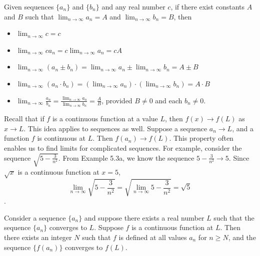 \documentclass{report}
\begin{document}
      \bigbreak \noindent 
      \begin{thrm}
          Given sequences \( \{a_n\} \) and \( \{b_n\} \) and any real number \( c \), if there exist constants \( A \) and \( B \) such that \( \lim_{{n \to \infty}} a_n = A \) and \( \lim_{{n \to \infty}} b_n = B \), then
          \begin{itemize}
            \item \( \lim_{{n \to \infty}} c = c \)
            \item \( \lim_{{n \to \infty}} c a_n = c \lim_{{n \to \infty}} a_n = cA \)
            \item \( \lim_{{n \to \infty}} (a_n \pm b_n) = \lim_{{n \to \infty}} a_n \pm \lim_{{n \to \infty}} b_n = A \pm B \)
            \item \( \lim_{{n \to \infty}} (a_n \cdot b_n) = (\lim_{{n \to \infty}} a_n) \cdot (\lim_{{n \to \infty}} b_n) = A \cdot B \)
            \item \( \lim_{{n \to \infty}} \frac{a_n}{b_n} = \frac{\lim_{{n \to \infty}} a_n}{\lim_{{n \to \infty}} b_n} = \frac{A}{B} \), provided \( B \neq 0 \) and each \( b_n \neq 0 \).
        \end{itemize}
      \end{thrm}

      \pagebreak \bigbreak \noindent 
      Recall that if \( f \) is a continuous function at a value \( L \), then \( f(x) \to f(L) \) as \( x \to L \). This idea applies to sequences as well. Suppose a sequence \( a_n \to L \), and a function \( f \) is continuous at \( L \). Then \( f(a_n) \to f(L) \). This property often enables us to find limits for complicated sequences. For example, consider the sequence \( \sqrt{5 - \frac{3}{n^2}} \). From Example 5.3a, we know the sequence \( 5 - \frac{3}{n^2} \to 5 \). Since \( \sqrt{x} \) is a continuous function at \( x = 5 \),
      \[ \lim_{{n \to \infty}} \sqrt{5 - \frac{3}{n^2}} = \sqrt{\lim_{{n \to \infty}} 5 - \frac{3}{n^2}} = \sqrt{5} \].
      \bigbreak \noindent 
      \begin{thrm}
          Consider a sequence \( \{a_n\} \) and suppose there exists a real number \( L \) such that the sequence \( \{a_n\} \) converges to \( L \). Suppose \( f \) is a continuous function at \( L \). Then there exists an integer \( N \) such that \( f \) is defined at all values \( a_n \) for \( n \geq N \), and the sequence \( \{f(a_n)\} \) converges to \( f(L) \).
      \end{thrm}
\end{document}
